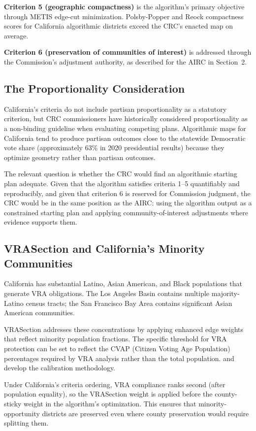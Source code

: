 \textbf{Criterion 5 (geographic compactness)} is the algorithm's primary
objective through METIS edge-cut minimization.  Polsby-Popper and Reock
compactness scores for California algorithmic districts exceed the CRC's
enacted map on average.

\textbf{Criterion 6 (preservation of communities of interest)} is addressed
through the Commission's adjustment authority, as described for the AIRC in
Section~2.

\subsection{The Proportionality Consideration}

California's criteria do not include partisan proportionality as a statutory
criterion, but CRC commissioners have historically considered proportionality
as a non-binding guideline when evaluating competing plans.  Algorithmic maps
for California tend to produce partisan outcomes close to the statewide
Democratic vote share (approximately 63\% in 2020 presidential results)
because they optimize geometry rather than partisan outcomes.

The relevant question is whether the CRC would find an algorithmic starting
plan adequate.  Given that the algorithm satisfies criteria 1--5 quantifiably
and reproducibly, and given that criterion 6 is reserved for Commission
judgment, the CRC would be in the same position as the AIRC: using the
algorithm output as a constrained starting plan and applying community-of-interest
adjustments where evidence supports them.

\subsection{VRASection and California's Minority Communities}

California has substantial Latino, Asian American, and Black populations that
generate VRA obligations.  The Los Angeles Basin contains multiple majority-Latino
census tracts; the San Francisco Bay Area contains significant Asian American
communities.

VRASection addresses these concentrations by applying enhanced edge weights
that reflect minority population fractions.  The specific threshold for VRA
protection can be set to reflect the CVAP (Citizen Voting Age Population)
percentages required by VRA analysis rather than the total population.
\citet{dellaLibera2026vra} and \citet{dellaLibera2026threshold} develop the
calibration methodology.

Under California's criteria ordering, VRA compliance ranks second (after
population equality), so the VRASection weight is applied before the
county-sticky weight in the algorithm's optimization.  This ensures that
minority-opportunity districts are preserved even where county preservation
would require splitting them.
